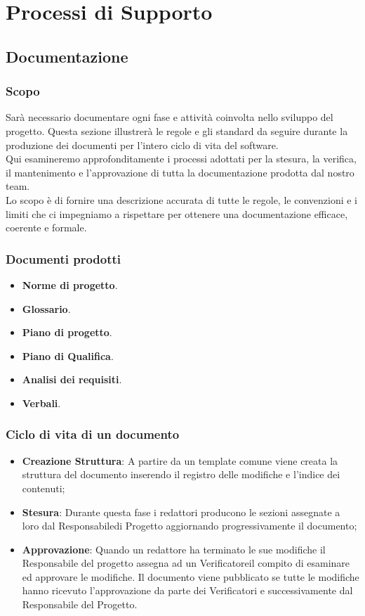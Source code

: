 \section{Processi di Supporto}

\subsection{Documentazione}
\subsubsection{Scopo}
Sarà necessario documentare ogni fase e attività coinvolta nello sviluppo del progetto. Questa sezione illustrerà le regole e gli standard da seguire durante la produzione 
dei documenti per l'intero ciclo di vita del software. \\
Qui esamineremo approfonditamente i processi adottati per la stesura, la verifica\glo, il mantenimento e l’approvazione di tutta la documentazione prodotta dal nostro team. \\
Lo scopo è di fornire una descrizione accurata di tutte le regole, le convenzioni e i limiti che ci impegniamo a rispettare per ottenere una documentazione efficace, coerente e formale.\\

\subsubsection{Documenti prodotti}
\begin{itemize}
    \item \textbf{Norme di progetto}.
    \item \textbf{Glossario}.
    \item \textbf{Piano di progetto}.
    \item \textbf{Piano di Qualifica}.
    \item \textbf{Analisi dei requisiti}.
    \item \textbf{Verbali}.
\end{itemize}

\subsubsection{Ciclo di vita di un documento}
\begin{itemize}
    \item \textbf{Creazione Struttura}: A partire da un template comune viene creata la struttura del documento inserendo il registro delle modifiche e l’indice dei contenuti;
    \item \textbf{Stesura}: Durante questa fase i redattori producono le sezioni assegnate a loro dal Responsabile\glo di Progetto aggiornando progressivamente il documento;
    \item \textbf{Approvazione}: Quando un redattore ha terminato le sue modifiche il Responsabile del progetto assegna ad un Verificatore\glo il compito di esaminare ed approvare le modifiche.
Il documento viene pubblicato se tutte le modifiche hanno ricevuto l’approvazione da parte dei Verificatori e successivamente dal Responsabile del Progetto.
\end{itemize}
\newpage
